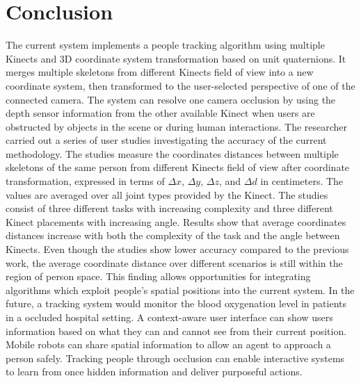 


\chapter{Conclusion}

\label{chapter:conclusion}

The current system implements a people tracking algorithm using multiple Kinects and 3D coordinate system transformation based on unit quaternions. It merges multiple skeletons from different Kinects field of view into a new coordinate system, then transformed to the user-selected perspective of one of the connected camera. The system can resolve one camera occlusion by using the depth sensor information from the other available Kinect when users are obstructed by objects in the scene or during human interactions. The researcher carried out a series of user studies investigating the accuracy of the current methodology. The studies measure the coordinates distances between multiple skeletons of the same person from different Kinects field of view after coordinate transformation, expressed in terms of $\Delta x$, $\Delta y$, $\Delta z$, and $\Delta d$ in centimeters. The values are averaged over all joint types provided by the Kinect. The studies consist of three different tasks with increasing complexity and three different Kinect placements with increasing angle. Results show that average coordinates distances increase with both the complexity of the task and the angle between Kinects. Even though the studies show lower accuracy compared to the previous work, the average coordinate distance over different scenarios is still within the region of person space. This finding allows opportunities for integrating algorithms which exploit people's spatial positions into the current system. In the future, a tracking system would monitor the blood oxygenation level in patients in a occluded hospital setting. A context-aware user interface can show users information based on what they can and cannot see from their current position. Mobile robots can share spatial information to allow an agent to approach a person safely. Tracking people through occlusion can enable interactive systems to learn from once hidden information and deliver purposeful actions.


